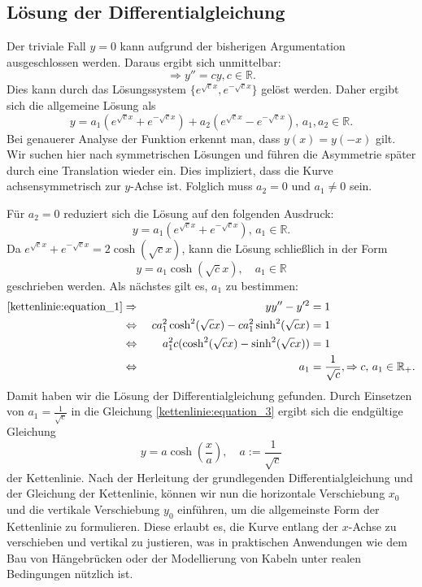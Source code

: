\subsection{Lösung der Differentialgleichung
\label{kettenlinie:subsection:Lösung der Differentialgleichung}}
Der triviale Fall \(y = 0\) kann aufgrund der bisherigen Argumentation ausgeschlossen werden.
Daraus ergibt sich unmittelbar:
\begin{equation}
	\Rightarrow
	y''
	=
	cy
	, c \in \mathbb{R}.
\end{equation}
Dies kann durch das Lösungssystem \(\{ e^{\sqrt{c}x}, e^{-\sqrt{c}x} \}\) gelöst werden.
Daher ergibt sich die allgemeine Lösung als
\begin{equation}
	y
	=
	a_1\left(e^{\sqrt{c}x} + e^{-\sqrt{c}x}\right) + a_2\left(e^{\sqrt{c}x} - e^{-\sqrt{c}x}\right), \, a_1, a_2 \in \mathbb{R}.
\end{equation}
Bei genauerer Analyse der Funktion erkennt man, dass \(y(x) = y(-x) \) gilt.
Wir suchen hier nach symmetrischen Lösungen und führen die Asymmetrie später durch eine Translation wieder ein.
Dies impliziert, dass die Kurve achsensymmetrisch zur \(y\)-Achse ist.
Folglich muss \(a_2 = 0\) und \(a_1 \neq 0\) sein.

Für \(a_2 = 0\) reduziert sich die Lösung auf den folgenden Ausdruck:
\begin{equation}
	y
	=
	a_1\left(e^{\sqrt{c}x} + e^{-\sqrt{c}x}\right), \, a_1 \in \mathbb{R}.
\end{equation}
Da \(e^{\sqrt{c}x} + e^{-\sqrt{c}x} = 2\cosh(\sqrt{c}x)\), kann die Lösung schließlich in der Form
\begin{equation}
	y
	=
	a_1\cosh(\sqrt{c}x), \quad a_1 \in \mathbb{R}
	\label{kettenlinie:equation_3}
\end{equation}
geschrieben werden.
Als nächstes gilt es, \(a_1\) zu bestimmen:
\begin{align*}
	\eqref{kettenlinie:equation_1}
	&\Rightarrow &\
	yy'' - y'^2
	&=
	1
	\\
	&\Leftrightarrow &\
	ca_1^2\cosh^2(\sqrt{c}x) - ca_1^2\sinh^2(\sqrt{c}x)
	&=
	1
	\\
	&\Leftrightarrow &\
	a_1^2c(\cosh^2(\sqrt{c}x) - \sinh^2(\sqrt{c}x))
	&=
	1
	\\
	&\Leftrightarrow &\
	a_1
	&=
	\frac{1}{\sqrt{c}}, \Rightarrow c, \, a_1 \in \mathbb{R}_+.
\end{align*}
Damit haben wir die Lösung der Differentialgleichung gefunden. Durch Einsetzen von \(a_1 = \frac{1}{\sqrt{c}}\) in die Gleichung \eqref{kettenlinie:equation_3} ergibt sich die endgültige Gleichung
\begin{equation}
y = a \cosh\left(\frac{x}{a}\right), \quad a := \frac{1}{\sqrt{c}}
\end{equation}
der Kettenlinie.
Nach der Herleitung der grundlegenden Differentialgleichung und der Gleichung der Kettenlinie, können wir nun die horizontale Verschiebung \(x_0\) und die vertikale Verschiebung \(y_0\) einführen, um die allgemeinste Form der Kettenlinie zu formulieren.
Diese erlaubt es, die Kurve entlang der \(x\)-Achse zu verschieben und vertikal zu justieren, was in praktischen Anwendungen wie dem Bau von Hängebrücken oder der Modellierung von Kabeln unter realen Bedingungen nützlich ist.

